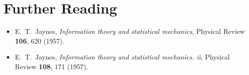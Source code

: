 \documentclass[pra,12pt]{revtex4}
\begin{document}
\section*{Further Reading}

\begin{itemize}
\item E.~T.~Jaynes, \textit{Information theory and statistical
  mechanics}, Physical Review \textbf{106}, 620 (1957).
\label{cite:jaynes}

\item E.~T.~Jaynes, \textit{Information theory and statistical
  mechanics. ii}, Physical Review \textbf{108}, 171 (1957).
\label{cite:jaynes2}
\end{itemize}
\end{document}
